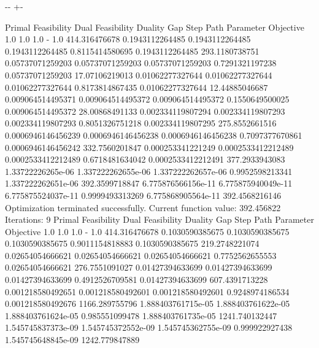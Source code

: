 \documentclass[letterpaper,10pt,english]{sphinxmanual}
\newlength\nbsphinxcodecellspacing
\begin{document}
{

\kern-\sphinxverbatimsmallskipamount\kern-\baselineskip
\kern+\FrameHeightAdjust\kern-\fboxrule
\vspace{\nbsphinxcodecellspacing}

\begin{sphinxVerbatim}[commandchars=\\\{\}]
Primal Feasibility  Dual Feasibility    Duality Gap         Step             Path Parameter      Objective
1.0                 1.0                 1.0                 -                1.0                 414.316476678
0.1943112264485     0.1943112264485     0.1943112264485     0.8115414580695  0.1943112264485     293.1180738751
0.05737071259203    0.05737071259203    0.05737071259203    0.7291321197238  0.05737071259203    17.07106219013
0.01062277327644    0.01062277327644    0.01062277327644    0.8173814867435  0.01062277327644    12.44885046687
0.009064514495371   0.009064514495372   0.009064514495372   0.1550649500025  0.009064514495372   28.00868491133
0.002334119807294   0.002334119807293   0.002334119807293   0.8051326751218  0.002334119807295   275.8552661516
0.0006946146456239  0.0006946146456238  0.0006946146456238  0.7097377670861  0.0006946146456242  332.7560201847
0.000253341221249   0.0002533412212489  0.0002533412212489  0.6718481634042  0.0002533412212491  377.2933943083
1.33722226265e-06   1.337222262655e-06  1.337222262657e-06  0.9952598213341  1.337222262651e-06  392.3599718847
6.775876566156e-11  6.775875940049e-11  6.775875524037e-11  0.9999493313269  6.775868905564e-11  392.4568216146
Optimization terminated successfully.
         Current function value: 392.456822
         Iterations: 9
Primal Feasibility  Dual Feasibility    Duality Gap         Step             Path Parameter      Objective
1.0                 1.0                 1.0                 -                1.0                 414.316476678
0.1030590385675     0.1030590385675     0.1030590385675     0.9011154818883  0.1030590385675     219.2748221074
0.02654054666621    0.02654054666621    0.02654054666621    0.7752562655553  0.02654054666621    276.7551091027
0.01427394633699    0.01427394633699    0.01427394633699    0.4912526709581  0.01427394633699    607.4391713228
0.001218580492651   0.001218580492601   0.001218580492601   0.9248974186534  0.001218580492676   1166.289755796
1.888403761715e-05  1.888403761622e-05  1.888403761624e-05  0.985551099478   1.888403761735e-05  1241.740132447
1.545745837373e-09  1.545745372552e-09  1.545745362755e-09  0.999922927438   1.545745648845e-09  1242.779847889

\end{sphinxVerbatim}}
\end{document}
